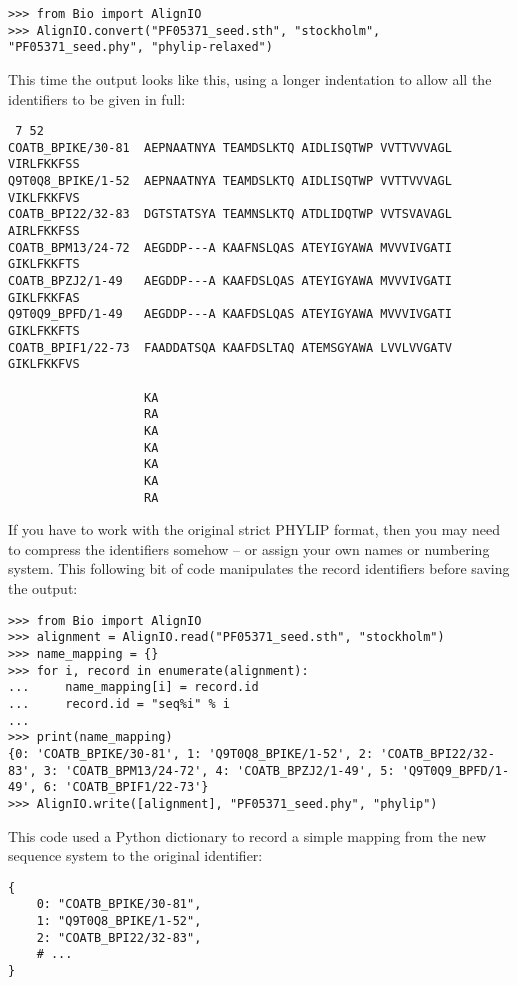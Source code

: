 \begin{verbatim}
>>> from Bio import AlignIO
>>> AlignIO.convert("PF05371_seed.sth", "stockholm", "PF05371_seed.phy", "phylip-relaxed")
\end{verbatim}

This time the output looks like this, using a longer indentation to
allow all the identifiers to be given in full:

\begin{verbatim}
 7 52
COATB_BPIKE/30-81  AEPNAATNYA TEAMDSLKTQ AIDLISQTWP VVTTVVVAGL VIRLFKKFSS
Q9T0Q8_BPIKE/1-52  AEPNAATNYA TEAMDSLKTQ AIDLISQTWP VVTTVVVAGL VIKLFKKFVS
COATB_BPI22/32-83  DGTSTATSYA TEAMNSLKTQ ATDLIDQTWP VVTSVAVAGL AIRLFKKFSS
COATB_BPM13/24-72  AEGDDP---A KAAFNSLQAS ATEYIGYAWA MVVVIVGATI GIKLFKKFTS
COATB_BPZJ2/1-49   AEGDDP---A KAAFDSLQAS ATEYIGYAWA MVVVIVGATI GIKLFKKFAS
Q9T0Q9_BPFD/1-49   AEGDDP---A KAAFDSLQAS ATEYIGYAWA MVVVIVGATI GIKLFKKFTS
COATB_BPIF1/22-73  FAADDATSQA KAAFDSLTAQ ATEMSGYAWA LVVLVVGATV GIKLFKKFVS

                   KA
                   RA
                   KA
                   KA
                   KA
                   KA
                   RA
\end{verbatim}

If you have to work with the original strict PHYLIP format, then you may need to
compress the identifiers somehow -- or assign your own names or numbering system.
This following bit of code manipulates the record identifiers before saving the output:

\begin{verbatim}
>>> from Bio import AlignIO
>>> alignment = AlignIO.read("PF05371_seed.sth", "stockholm")
>>> name_mapping = {}
>>> for i, record in enumerate(alignment):
...     name_mapping[i] = record.id
...     record.id = "seq%i" % i
...
>>> print(name_mapping)
{0: 'COATB_BPIKE/30-81', 1: 'Q9T0Q8_BPIKE/1-52', 2: 'COATB_BPI22/32-83', 3: 'COATB_BPM13/24-72', 4: 'COATB_BPZJ2/1-49', 5: 'Q9T0Q9_BPFD/1-49', 6: 'COATB_BPIF1/22-73'}
>>> AlignIO.write([alignment], "PF05371_seed.phy", "phylip")
\end{verbatim}

\noindent This code used a Python dictionary to record a simple mapping from the new sequence system to the original identifier:
\begin{verbatim}
{
    0: "COATB_BPIKE/30-81",
    1: "Q9T0Q8_BPIKE/1-52",
    2: "COATB_BPI22/32-83",
    # ...
}
\end{verbatim}

